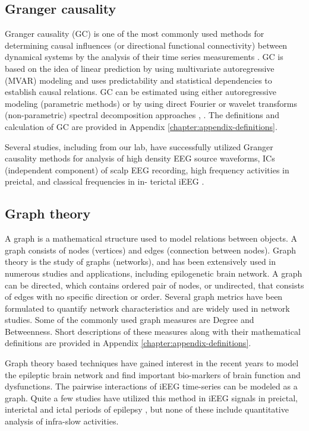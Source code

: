 \subsection{Granger causality}
Granger causality (GC) is one of the most commonly used methods for determining causal influences (or directional functional connectivity) between dynamical systems by the analysis of their time series measurements \citep{granger1969investigating}. GC is based on the idea of linear prediction by using multivariate autoregressive (MVAR) modeling \citep{wiener1956theory} and uses predictability and statistical dependencies to establish causal relations. GC can be estimated using either autoregressive modeling (parametric methods) or by using direct Fourier or wavelet transforms (non-parametric) spectral decomposition approaches \citep{dhamala2008estimating}, \citep{ding200617}. The definitions and calculation of GC are provided in Appendix \ref{chapter:appendix-definitions}.

Several studies, including from our lab, have successfully utilized Granger causality methods for analysis of high density EEG source waveforms, ICs (independent component) of scalp EEG recording, high frequency activities in preictal, and classical frequencies in in- terictal iEEG \citep{coben2015neural, coito2015dynamic, epstein2014application, park2018granger}. 

\subsection{Graph theory}
A graph is a mathematical structure used to model relations between objects. A graph consists of nodes (vertices) and edges (connection between nodes). Graph theory is the study of graphs (networks), and has been extensively used in numerous studies and applications, including epilogenetic brain network. A graph can be directed, which contains ordered pair of nodes, or undirected, that consists of edges with no specific direction or order. Several graph metrics have been formulated to quantify network characteristics and are widely used in network studies. Some of the commonly used graph measures are Degree and Betweenness. Short descriptions of these measures along with their mathematical definitions are provided in Appendix \ref{chapter:appendix-definitions}.

Graph theory based techniques have gained interest in the recent years to model the epileptic brain network and find important bio-markers of brain function and dysfunctions. The pairwise interactions of iEEG time-series can be modeled as a graph. Quite a few studies have utilized this method in iEEG signals in preictal, interictal and ictal periods of epilepsy \citep{wilke2011graph, van2013ictal, bartolomei2013interictal, vecchio2016pre}, but none of these include quantitative analysis of infra-slow activities.

